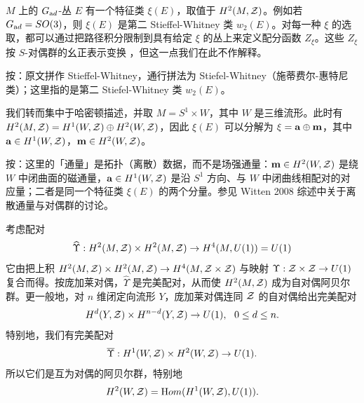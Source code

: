 $M$ 上的 $\Gad$-丛 $E$ 有一个特征类 $\xi(E)$，取值于 $H^2(M,\CZ)$。例如若 $G_{{\rm ad}}=SO(3)$，则 $\xi(E)$ 是第二 Stieffel-Whitney 类 $w_2(E)$。对每一种 $\xi$ 的选取，都可以通过把路径积分限制到具有给定 $\xi$ 的丛上来定义配分函数 $Z_\xi$。这些 $Z_\xi$ 按 $S$-对偶群的幺正表示变换 \cite{ref45,ref26}，但这一点我们在此不作解释。

\begin{yizhu}[原文疑误]
按：原文拼作 Stieffel-Whitney，通行拼法为 Stiefel-Whitney（施蒂费尔-惠特尼类）；这里指的是第二 Stiefel-Whitney 类 $w_2(E)$。
\end{yizhu}

我们转而集中于哈密顿描述，并取 $M=S^1\times W$，其中 $W$ 是三维流形。此时有 $H^2(M,\CZ)=H^1(W,\CZ)\oplus H^2(W,\CZ)$，因此 $\xi(E)$ 可以分解为 $\xi={\bf a}\oplus {\bf m}$，其中 ${\bf a}\in H^1(W,\CZ)$，${\bf m}\in H^2(W,\CZ)$。

\begin{yizhu}[物理图像]
按：这里的「通量」是拓扑（离散）数据，而不是场强通量：${\bf m}\in H^2(W,\CZ)$ 是绕 $W$ 中闭曲面的磁通量，${\bf a}\in H^1(W,\CZ)$ 是沿 $S^1$ 方向、与 $W$ 中闭曲线相配对的对应量；二者是同一个特征类 $\xi(E)$ 的两个分量。参见 Witten 2008 综述中关于离散通量与对偶群的讨论。
\end{yizhu}

考虑配对 %
\setcounter{equation}{2}
\begin{equation}\label{eq:junko}
\hat \Upsilon:H^2(M,\CZ)\times
H^2(M,\CZ)\to H^4(M,U(1))=U(1)
\end{equation}
它由把上积 $H^2(M,\CZ)\times H^2(M,\CZ)\to H^4(M,\CZ\times\CZ)$ 与映射 $\Upsilon:\CZ\times\CZ\to U(1)$ 复合而得。按庞加莱对偶，$\hat\Upsilon$ 是完美配对，从而使 $H^2(M,\CZ)$ 成为自对偶阿贝尔群。更一般地，对 $n$ 维闭定向流形 $Y$，庞加莱对偶连同 $\CZ$ 的自对偶给出完美配对
\setcounter{equation}{3}
\begin{equation}\label{eq:unko}
H^d(Y,\CZ)\times H^{n-d}(Y,\CZ)\to U(1), ~~0\leq d\leq
n.
\end{equation}
特别地，我们有完美配对
\setcounter{equation}{4}
\begin{equation}\label{eq:normo}
\bar\Upsilon:H^1(W,\CZ)\times H^2(W,\CZ)\to U(1).
\end{equation}
所以它们是互为对偶的阿贝尔群，特别地
\setcounter{equation}{5}
\begin{equation}\label{eq:junok}
H^2(W,\CZ)={\rm Hom}(H^1(W,\CZ),U(1)).
\end{equation}

